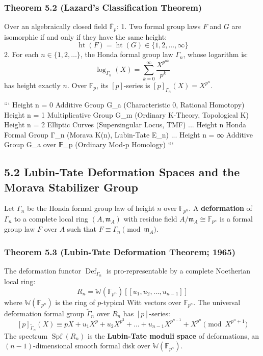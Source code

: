 \documentclass[11pt,twoside,openright]{amsbook}
\begin{document}
{{\subsubsection{Theorem 5.2 (Lazard's Classification Theorem)}
Over an algebraically closed field $\bar{\mathbb{F}}_p$:
1. Two formal group laws $F$ and $G$ are isomorphic if and only if they have the same height:
   $$\operatorname{ht}(F) = \operatorname{ht}(G) \in \{1, 2, \dots, \infty\}$$
2. For each $n \in \{1, 2, \dots\}$, the Honda formal group law $\Gamma_n$, whose logarithm is:
   $$\log_{\Gamma_n}(X) = \sum_{k=0}^\infty \frac{X^{p^{nk}}}{p^k}$$
   has height exactly $n$. Over $\mathbb{F}_p$, its $[p]$-series is $[p]_{\Gamma_n}(X) = X^{p^n}$.

```
     Height n = 0   Additive Group G_a (Characteristic 0, Rational Homotopy)
     Height n = 1   Multiplicative Group G_m (Ordinary K-Theory, Topological K)
     Height n = 2   Elliptic Curves (Supersingular Locus, TMF)
     ...
     Height n       Honda Formal Group Γ_n (Morava K(n), Lubin-Tate E_n)
     ...
     Height n = ∞   Additive Group G_a over 𝔽_p (Ordinary Mod-p Homology)
```

\subsection{5.2 Lubin-Tate Deformation Spaces and the Morava Stabilizer Group}
Let $\Gamma_n$ be the Honda formal group law of height $n$ over $\mathbb{F}_{p^n}$. A \textbf{deformation} of $\Gamma_n$ to a complete local ring $(A, \mathfrak{m}_A)$ with residue field $A/\mathfrak{m}_A \cong \mathbb{F}_{p^n}$ is a formal group law $F$ over $A$ such that $F \equiv \Gamma_n \pmod{\mathfrak{m}_A}$.

\subsubsection{Theorem 5.3 (Lubin-Tate Deformation Theorem; 1965)}
The deformation functor $\operatorname{Def}_{\Gamma_n}$ is pro-representable by a complete Noetherian local ring:
$$R_n = \mathbb{W}(\mathbb{F}_{p^n})[[u_1, u_2, \dots, u_{n-1}]]$$
where $\mathbb{W}(\mathbb{F}_{p^n})$ is the ring of $p$-typical Witt vectors over $\mathbb{F}_{p^n}$. The universal deformation formal group $\tilde{\Gamma}_n$ over $R_n$ has $[p]$-series:
$$[p]_{\tilde{\Gamma}_n}(X) \equiv p X + u_1 X^p + u_2 X^{p^2} + \dots + u_{n-1} X^{p^{n-1}} + X^{p^n} \pmod{X^{p^n+1}}$$
The spectrum $\operatorname{Spf}(R_n)$ is the \textbf{Lubin-Tate moduli space} of deformations, an $(n-1)$-dimensional smooth formal disk over $\mathbb{W}(\mathbb{F}_{p^n})$.

}}
\end{document}
